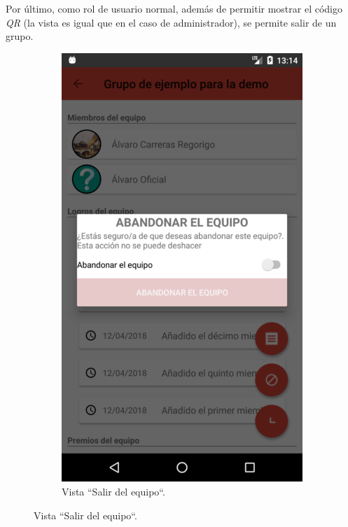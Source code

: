 \documentclass[twoside]{report}
\begin{document}
Por último, como rol de usuario normal, además de permitir mostrar el código \textit{QR} (la vista es igual que en el caso de administrador), se permite salir de un grupo.
\begin{figure}[H]
\begin{center}
	\begin{subfigure}[t]{.3\linewidth}
		\includegraphics[scale=0.2]{images/userguide/21.png}
		\caption{Vista “Salir del equipo“.}
	\end{subfigure}\hspace{5mm}%

\end{center}
\end{figure}
\end{document}
